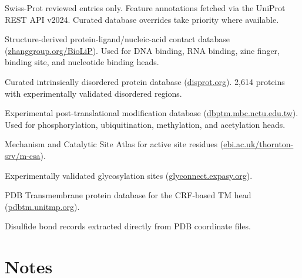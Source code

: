 \documentclass[11pt,a4paper]{article}
\begin{document}
\begin{description}[leftmargin=2.5cm, style=sameline, font=\bfseries]
  \item[UniProt] Swiss-Prot reviewed entries only. Feature annotations fetched via the UniProt REST API v2024. Curated database overrides take priority where available.
  \item[BioLiP] Structure-derived protein-ligand/nucleic-acid contact database (\href{https://zhanggroup.org/BioLiP/}{zhanggroup.org/BioLiP}). Used for DNA binding, RNA binding, zinc finger, binding site, and nucleotide binding heads.
  \item[DisProt] Curated intrinsically disordered protein database (\href{https://disprot.org}{disprot.org}). 2,614 proteins with experimentally validated disordered regions.
  \item[dbPTM] Experimental post-translational modification database (\href{https://dbptm.mbc.nctu.edu.tw}{dbptm.mbc.nctu.edu.tw}). Used for phosphorylation, ubiquitination, methylation, and acetylation heads.
  \item[M-CSA] Mechanism and Catalytic Site Atlas for active site residues (\href{https://www.ebi.ac.uk/thornton-srv/m-csa/}{ebi.ac.uk/thornton-srv/m-csa}).
  \item[GlyConnect] Experimentally validated glycosylation sites (\href{https://glyconnect.expasy.org}{glyconnect.expasy.org}).
  \item[PDBTM] PDB Transmembrane protein database for the CRF-based TM head (\href{https://pdbtm.unitmp.org}{pdbtm.unitmp.org}).
  \item[PDB SSBOND] Disulfide bond records extracted directly from PDB coordinate files.
\end{description}

\section{Notes}
\end{document}

